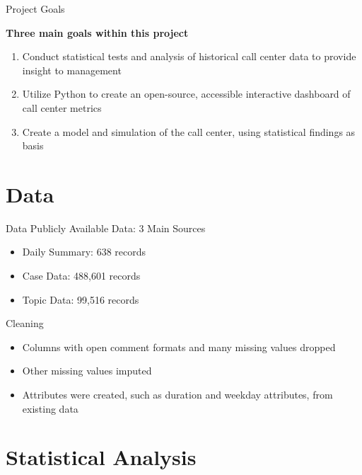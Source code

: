 \documentclass{beamer}
\begin{document}
\begin{frame}{Project Goals}
\begin{center}
\textbf{Three main goals within this project}
\end{center}
\begin{enumerate}
    \item Conduct statistical tests and analysis of historical call center data to provide insight to management
     \item Utilize Python to create an open-source, accessible interactive dashboard of call center metrics
     \item Create a model and simulation of the call center, using statistical findings as basis
\end{enumerate}
\end{frame}



\section{Data}

\begin{frame}{Data}
Publicly Available Data: 3 Main Sources
\begin{itemize}
    \item Daily Summary: 638 records
    \item Case Data: 488,601 records
    \item Topic Data: 99,516 records
\end{itemize}
Cleaning
\begin{itemize}
    \item Columns with open comment formats and many missing values dropped
    \item Other missing values imputed
    \item Attributes were created, such as duration and weekday attributes, from existing data
\end{itemize}
\end{frame}





\section{Statistical Analysis} 
\end{document}

